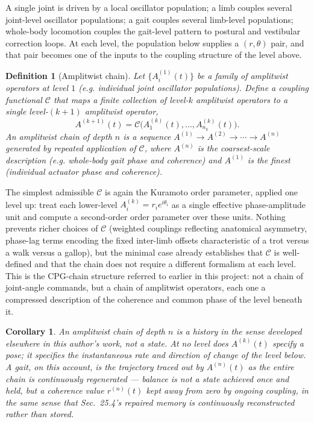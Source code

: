 \documentclass[12pt]{article}
\newtheorem{definition}{Definition}
\newtheorem{corollary}{Corollary}
\begin{document}
A single joint is driven by a local oscillator population; a limb couples several joint-level oscillator populations; a gait couples several limb-level populations; whole-body locomotion couples the gait-level pattern to postural and vestibular correction loops. At each level, the population below supplies a $(r,\theta)$ pair, and that pair becomes one of the inputs to the coupling structure of the level above.

\begin{definition}[Amplitwist chain]
Let $\{A^{(1)}_i(t)\}$ be a family of amplitwist operators at level $1$ (e.g. individual joint oscillator populations). Define a coupling functional $\mathcal{C}$ that maps a finite collection of level-$k$ amplitwist operators to a single level-$(k+1)$ amplitwist operator,
\[
A^{(k+1)}(t) = \mathcal{C}\big(A^{(k)}_1(t), \dots, A^{(k)}_{n_k}(t)\big).
\]
An \emph{amplitwist chain} of depth $n$ is a sequence $A^{(1)} \to A^{(2)} \to \cdots \to A^{(n)}$ generated by repeated application of $\mathcal{C}$, where $A^{(n)}$ is the coarsest-scale description (e.g. whole-body gait phase and coherence) and $A^{(1)}$ is the finest (individual actuator phase and coherence).
\end{definition}

The simplest admissible $\mathcal{C}$ is again the Kuramoto order parameter, applied one level up: treat each lower-level $A^{(k)}_i = r_i e^{i\theta_i}$ as a single effective phase-amplitude unit and compute a second-order order parameter over these units. Nothing prevents richer choices of $\mathcal{C}$ (weighted couplings reflecting anatomical asymmetry, phase-lag terms encoding the fixed inter-limb offsets characteristic of a trot versus a walk versus a gallop), but the minimal case already establishes that $\mathcal{C}$ is well-defined and that the chain does not require a different formalism at each level. This is the CPG-chain structure referred to earlier in this project: not a chain of joint-angle commands, but a chain of amplitwist operators, each one a compressed description of the coherence and common phase of the level beneath it.

\begin{corollary}
An amplitwist chain of depth $n$ is a history in the sense developed elsewhere in this author's work, not a state. At no level does $A^{(k)}(t)$ specify a pose; it specifies the instantaneous rate and direction of change of the level below. A gait, on this account, is the trajectory traced out by $A^{(n)}(t)$ as the entire chain is continuously regenerated — balance is not a state achieved once and held, but a coherence value $r^{(n)}(t)$ kept away from zero by ongoing coupling, in the same sense that Sec.\ 25.4's repaired memory is continuously reconstructed rather than stored.
\end{corollary}
\end{document}
